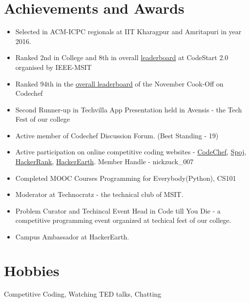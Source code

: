\documentclass[margin, centered]{res}
\begin{document}
\begin{resume}
\section{Achievements and Awards}
\begin{itemize}[leftmargin=*]
 \item Selected in ACM-ICPC regionals at IIT Kharagpur and Amritapuri in year 2016.
 \item Ranked 2nd in College and 8th in overall \href {https://www.hackerearth.com/CodeStart2/leaderboard/}{leaderboard} at CodeStart 2.0 organised by IEEE-MSIT
 \item Ranked 94th in the \href {https://www.codechef.com/rankings/COOK76}{overall leaderboard} of the November Cook-Off on Codechef
 \item Second Runner­-up in Techvilla­ App Presentation held in Avensis - the Tech Fest of our college
 \item Active member of Codechef Discussion Forum. (Best Standing - 19)
 \item Active participation on online competitive coding websites - \href{http://www.codechef.com/users/nickzuck_007}{CodeChef}, \href{http://www.spoj.com/users/nickzuck\_007/}{Spoj}, \href{http://hackerrank.com/nickzuck\_007}{HackerRank}, \href {https://www.hackerearth.com/@nickzuck\_007}{HackerEarth}. Member Handle - nickzuck\_007
 \item Completed MOOC Courses Programming for Everybody(Python), CS101
 \item Moderator at Technocratz - the technical club of MSIT.
 \item Problem Curator  and Techincal Event Head in Code till You Die - a competitive programming event organized at techical fest of our college.
 \item Campus Ambassador at HackerEarth. 
\end{itemize}


\section{Hobbies}
Competitive Coding, Watching TED talks, Chatting

\end{resume}
\end{document}
